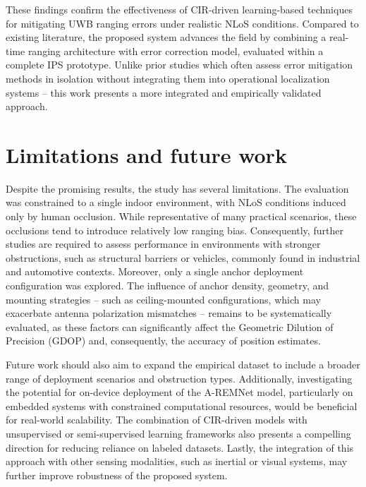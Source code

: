 These findings confirm the effectiveness of CIR-driven learning-based techniques for mitigating UWB ranging errors under realistic NLoS conditions. Compared to existing literature, the proposed system advances the field by combining a real-time ranging architecture with error correction model, evaluated within a complete IPS prototype. Unlike prior studies which often assess error mitigation methods in isolation without integrating them into operational localization systems -- this work presents a more integrated and empirically validated approach.

\section{Limitations and future work}

Despite the promising results, the study has several limitations. The evaluation was constrained to a single indoor environment, with NLoS conditions induced only by human occlusion. While representative of many practical scenarios, these occlusions tend to introduce relatively low ranging bias. Consequently, further studies are required to assess performance in environments with stronger obstructions, such as structural barriers or vehicles, commonly found in industrial and automotive contexts. Moreover, only a single anchor deployment configuration was explored. The influence of anchor density, geometry, and mounting strategies -- such as ceiling-mounted configurations, which may exacerbate antenna polarization mismatches -- remains to be systematically evaluated, as these factors can significantly affect the Geometric Dilution of Precision (GDOP) and, consequently, the accuracy of position estimates.

Future work should also aim to expand the empirical dataset to include a broader range of deployment scenarios and obstruction types. Additionally, investigating the potential for on-device deployment of the A-REMNet model, particularly on embedded systems with constrained computational resources, would be beneficial for real-world scalability. The combination of CIR-driven models with unsupervised or semi-supervised learning frameworks also presents a compelling direction for reducing reliance on labeled datasets. Lastly, the integration of this approach with other sensing modalities, such as inertial or visual systems, may further improve robustness of the proposed system.
